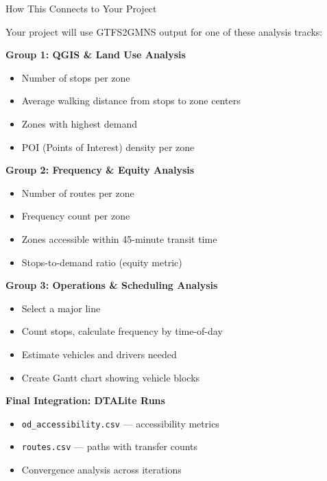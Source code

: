 \documentclass[11pt,letterpaper]{article}
\begin{document}
\begin{connectionbox}{How This Connects to Your Project}

Your project will use GTFS2GMNS output for one of these analysis tracks:

\vspace{0.3cm}
\textbf{Group 1: QGIS \& Land Use Analysis}
\begin{itemize}[nosep]
    \item Number of stops per zone
    \item Average walking distance from stops to zone centers
    \item Zones with highest demand
    \item POI (Points of Interest) density per zone
\end{itemize}

\vspace{0.3cm}
\textbf{Group 2: Frequency \& Equity Analysis}
\begin{itemize}[nosep]
    \item Number of routes per zone
    \item Frequency count per zone
    \item Zones accessible within 45-minute transit time
    \item Stops-to-demand ratio (equity metric)
\end{itemize}

\vspace{0.3cm}
\textbf{Group 3: Operations \& Scheduling Analysis}
\begin{itemize}[nosep]
    \item Select a major line
    \item Count stops, calculate frequency by time-of-day
    \item Estimate vehicles and drivers needed
    \item Create Gantt chart showing vehicle blocks
\end{itemize}

\vspace{0.3cm}
\textbf{Final Integration: DTALite Runs}
\begin{itemize}[nosep]
    \item \texttt{od\_accessibility.csv} --- accessibility metrics
    \item \texttt{routes.csv} --- paths with transfer counts
    \item Convergence analysis across iterations
\end{itemize}

\end{connectionbox}
\end{document}
